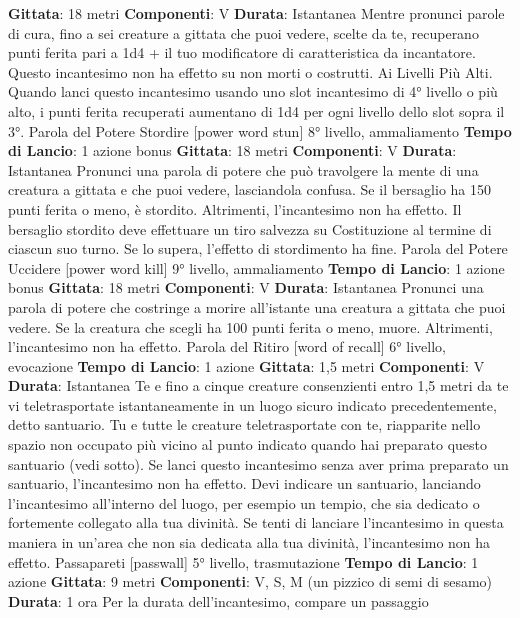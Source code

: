 \begin{multicols}{2}
\textbf{Gittata}: 18 metri
\textbf{Componenti}: V
\textbf{Durata}: Istantanea
Mentre pronunci parole di cura, fino a sei creature a
gittata che puoi vedere, scelte da te, recuperano punti
ferita pari a 1d4 + il tuo modificatore di caratteristica da
incantatore. Questo incantesimo non ha effetto su non
morti o costrutti.
Ai Livelli Più Alti. Quando lanci questo incantesimo
usando uno slot incantesimo di 4° livello o più alto, i
punti ferita recuperati aumentano di 1d4 per ogni livello
dello slot sopra il 3°.
Parola del Potere Stordire
[power word stun]
8° livello, ammaliamento
\textbf{Tempo di Lancio}: 1 azione bonus
\textbf{Gittata}: 18 metri
\textbf{Componenti}: V
\textbf{Durata}: Istantanea
Pronunci una parola di potere che può travolgere la
mente di una creatura a gittata e che puoi vedere,
lasciandola confusa. Se il bersaglio ha 150 punti ferita o
meno, è stordito. Altrimenti, l’incantesimo non ha
effetto.
Il bersaglio stordito deve effettuare un tiro salvezza su
Costituzione al termine di ciascun suo turno. Se lo
supera, l’effetto di stordimento ha fine.
Parola del Potere Uccidere
[power word kill]
9° livello, ammaliamento
\textbf{Tempo di Lancio}: 1 azione bonus
\textbf{Gittata}: 18 metri
\textbf{Componenti}: V
\textbf{Durata}: Istantanea
Pronunci una parola di potere che costringe a morire
all’istante una creatura a gittata che puoi vedere. Se la
creatura che scegli ha 100 punti ferita o meno, muore.
Altrimenti, l’incantesimo non ha effetto.
Parola del Ritiro
[word of recall]
6° livello, evocazione
\textbf{Tempo di Lancio}: 1 azione
\textbf{Gittata}: 1,5 metri
\textbf{Componenti}: V
\textbf{Durata}: Istantanea
Te e fino a cinque creature consenzienti entro 1,5 metri
da te vi teletrasportate istantaneamente in un luogo
sicuro indicato precedentemente, detto santuario. Tu e
tutte le creature teletrasportate con te, riapparite nello
spazio non occupato più vicino al punto indicato quando
hai preparato questo santuario (vedi sotto). Se lanci
questo incantesimo senza aver prima preparato un
santuario, l’incantesimo non ha effetto.
Devi indicare un santuario, lanciando l’incantesimo
all’interno del luogo, per esempio un tempio, che sia
dedicato o fortemente collegato alla tua divinità. Se tenti
di lanciare l’incantesimo in questa maniera in un’area
che non sia dedicata alla tua divinità, l’incantesimo non
ha effetto.
Passapareti
[passwall]
5° livello, trasmutazione
\textbf{Tempo di Lancio}: 1 azione
\textbf{Gittata}: 9 metri
\textbf{Componenti}: V, S, M (un pizzico di semi di sesamo)
\textbf{Durata}: 1 ora
Per la durata dell’incantesimo, compare un passaggio

\end{multicols}
